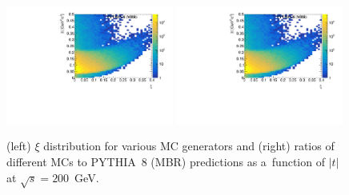 \begin{figure}[h!]
	\centering
	\includegraphics[width=0.49\textwidth, page=14]{chapters/dataSampleSTAR/img/true.pdf}
	\includegraphics[width=0.49\textwidth, page=13]{chapters/dataSampleSTAR/img/true.pdf}
	\caption{(left) $\xi$ distribution for various MC generators and  (right)  ratios of different MCs to PYTHIA~8 (MBR) predictions as a~function of $|t|$   at $\sqrt{s} = 200$~GeV.}
	\label{fig:STARtrueMC}
\end{figure}